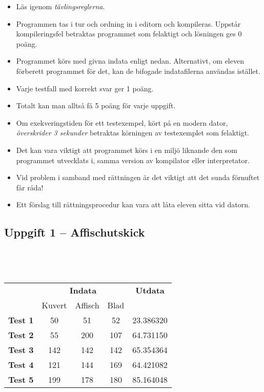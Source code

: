 \documentclass[a4paper,12pt,oneside]{amsbook}
\theoremstyle{test}
\newcommand{\fe}[1]{\textbf{#1}}            %
\begin{document}


\thispagestyle{fancy}
\lhead{}
\begin{itemize}
\item Läs igenom \textit{tävlingsreglerna}.
\item Programmen tas i tur och ordning in i editorn och kompileras.
Uppstår kompileringsfel betraktas programmet som felaktigt och lösningen
ges $0$ poäng.
\item Programmet körs med givna indata enligt nedan. Alternativt, om eleven förberett programmet för det, kan de bifogade indatafilerna användas istället.
\item Varje testfall
  med korrekt svar ger 1 poäng.
\item
Totalt kan man
  alltså få 5 poäng för varje uppgift.
\item Om exekveringstiden för ett testexempel, kört på en modern dator,
\textit{överskrider 3 sekunder} betraktas körningen av testexemplet som felaktigt.
\item Det kan vara viktigt att programmet körs i en miljö liknande den som
programmet utvecklats i, samma version av kompilator eller
interpretator.
\item Vid problem i samband med rättningen är det viktigt att det sunda
förnuftet får råda!
\item Ett förslag till rättningsprocedur kan vara att låta eleven
sitta vid datorn.
\end{itemize}

\vspace{2cm}

\subsection*{Uppgift 1 -- Affischutskick}
~\\
{\tt 
\begin{tabular}{||l||c|c|c||c||}\hline\hline
& \multicolumn{3}{c||}{\fe{Indata}} & \fe{Utdata} \\ 
& Kuvert & Affisch & Blad & \\ \hline \hline
\fe{Test 1} & 50 & 51 & 52 & 23.386320  \\ \hline
\fe{Test 2} & 55 & 200 & 107 &  64.731150  \\ \hline
\fe{Test 3} & 142 & 142 & 142 &  65.354364 \\ \hline
\fe{Test 4} & 121 & 144 & 169 & 64.421082\\ \hline
\fe{Test 5} & 199 & 178 & 180 & 85.164048  \\ \hline\hline
\end{tabular}
}
\end{document}
